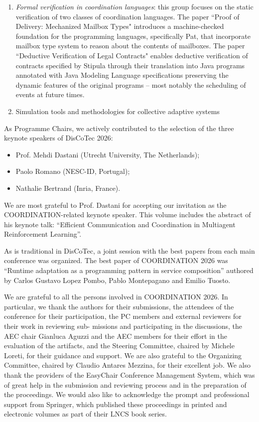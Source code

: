 \documentclass[]{llncs}
\begin{document}
\begin{enumerate}
	\item \emph{Formal verification in coordination languages}: this group focuses on the static verification of two classes of coordination languages. The paper ``Proof of Delivery: Mechanized Mailbox Types" introduces a machine-checked foundation for the programming languages, specifically Pat, that incorporate mailbox type system to reason about the contents of mailboxes. The paper ``Deductive Verification of Legal Contracts" enables deductive verification of contracts specified by Stipula through their translation into Java programs annotated with Java 
	Modeling Language specifications preserving the dynamic
	features of the original programs – most notably the scheduling of events at future times.
	\item Simulation tools and methodologies for collective adaptive systems
\end{enumerate} 


As Programme Chairs, we actively contributed to the selection of the three keynote
speakers of DisCoTec 2026:\begin{itemize}
	\item Prof. Mehdi Dastani (Utrecht University, The Netherlands);
	\item Paolo Romano (NESC-ID, Portugal);
	\item Nathalie Bertrand (Inria, France).
\end{itemize}
We are most grateful to Prof. Dastani for accepting our invitation as the  COORDINATION-related keynote speaker. This volume includes the abstract of his keynote
talk: “Efficient Communication and Coordination in Multiagent Reinforcement Learning”.


As is traditional in DisCoTec, a joint session with the best papers from each main conference was organized. The best paper of COORDINATION 2026 was “Runtime adaptation as a programming pattern in service composition” authored by Carlos Gustavo Lopez Pombo, Pablo Montepagano and Emilio Tuosto. 

We are grateful to all the persons involved in COORDINATION 2026. In particular,
we thank the authors for their submissions, the attendees of the conference for their
participation, the PC members and external reviewers for their work in reviewing sub-
missions and participating in the discussions, the AEC chair Gianluca Aguzzi and
the AEC members for their effort in the evaluation of the artifacts, and the Steering Committee,
chaired by Michele Loreti, for their guidance and support. We are also grateful to the
Organizing Committee, chaired by Claudio Antares Mezzina, for their excellent job. We also thank
the providers of the EasyChair Conference Management System, which was of great
help in the submission and reviewing process and in the preparation of the proceedings.
We would also like to acknowledge the prompt and professional support from Springer,
which published these proceedings in printed and electronic volumes as part of their
LNCS book series.
\end{document}
